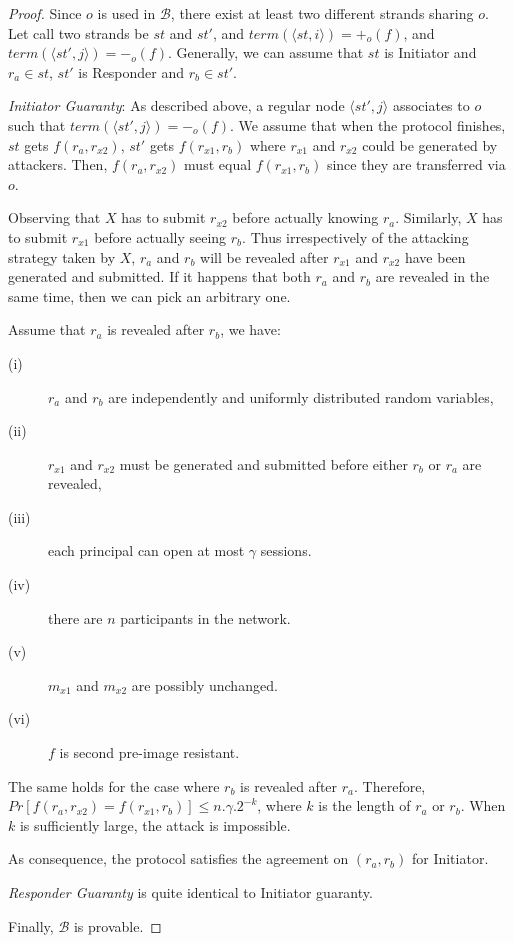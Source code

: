 \begin{proof}

Since $o$ is used in $\mathcal{B}$, there exist at least two different strands sharing $o$. Let call two strands be $st$ and $st'$, and $term(\langle st,i\rangle )=+_o(f)$, and $term(\langle st',j\rangle ) = -_o(f)$. Generally, we can assume that $st$ is Initiator and $r_a \in st$, $st'$ is Responder and $r_b \in st'$. 

\emph{Initiator Guaranty}: As described above, a regular node $\langle st',j\rangle $ associates to $o$ such that $term(\langle st',j\rangle ) = -_o(f)$. We assume that when the protocol finishes, $st$ gets $f(r_a,r_{x2})$, $st'$ gets $f(r_{x1},r_b)$ where $r_{x1}$ and $r_{x2}$ could be generated by attackers. Then, $f(r_a,r_{x2})$ must equal $f(r_{x1},r_b)$ since they are transferred via $o$. 

Observing that $X$ has to submit $r_{x2}$ before actually knowing $r_a$. Similarly, $X$ has to submit $r_{x1}$ before actually seeing $r_b$. Thus irrespectively of the attacking strategy taken by $X$, $r_a$ and $r_b$ will be revealed after $r_{x1}$ and $r_{x2}$ have been generated and submitted. If it happens that both $r_a$ and $r_b$ are revealed in the same time, then we can pick an arbitrary one. 

Assume that $r_a$ is revealed after $r_b$, we have:
\begin{description}
 \item [(i)] $r_a$ and $r_b$ are independently and uniformly distributed random variables, 
 \item [(ii)] $r_{x1}$ and $r_{x2}$ must be generated and submitted before either $r_b$ or $r_a$ are revealed, 
 \item [(iii)] each principal can open at most $\gamma$ sessions. 
 \item [(iv)] there are $n$ participants in the network. 
 \item [(v)] $m_{x1}$ and $m_{x2}$ are possibly unchanged.
 \item [(vi)] $f$ is second pre-image resistant. 
\end{description}
The same holds for the case where $r_b$ is revealed after $r_a$. Therefore, $Pr[f(r_a,r_{x2}) = f(r_{x1},r_b)] \leq n.\gamma.2^{-k}$, where $k$ is the length of $r_a$ or $r_b$. When $k$ is sufficiently large, the attack is impossible. 

As consequence, the protocol satisfies the agreement on $(r_a,r_b)$ for Initiator. 

\emph{Responder Guaranty} is quite identical to Initiator guaranty. 

Finally, $\mathcal{B}$ is provable. 
\end{proof}


